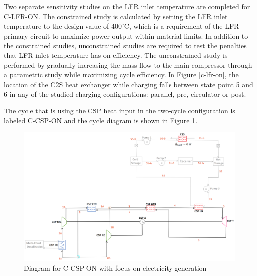 \begin{paracol}{2}
Two separate sensitivity studies on the LFR inlet temperature are completed for C-LFR-ON. The constrained study is calculated by setting the LFR inlet temperature to the design value of $400^{\circ}$C, which is a requirement of the LFR primary circuit to maximize power output within material limits. In addition to the constrained studies, unconstrained studies are required to test the penalties that LFR inlet temperature has on efficiency. The unconstrained study is performed by gradually increasing the mass flow to the main compressor through a parametric study while maximizing cycle efficiency. In Figure \ref{c-lfr-on}, the location of the C2S heat exchanger while charging falls between state point 5 and 6 in any of the studied charging configurations: parallel, pre, circulator or post. 

The cycle that is using the CSP heat input in the two-cycle configuration is labeled C-CSP-ON and the cycle diagram is shown in Figure \ref{c-csp-on}. 

\end{paracol}
\begin{figure}[H] 
    \widefigure
    \includegraphics[width=\linewidth]{Definitions/c-csp-on.pdf}
    \caption{Diagram for C-CSP-ON with focus on electricity generation\label{c-csp-on}}
\end{figure}
